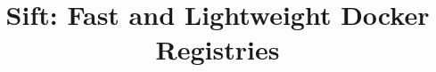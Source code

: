 \documentclass[10pt,twocolumn]{article}
\newcommand{\sysname}{Sift\xspace}
\begin{document}
\title{
\sysname: Fast and Lightweight Docker Registries
}



\date{}
\maketitle












%



{
}
\end{document}
